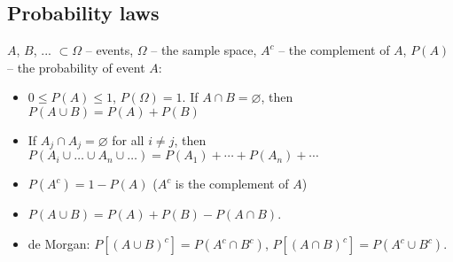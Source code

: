 \documentclass{article}
\newcommand{\Tr}[2]{#1}
\renewcommand{\vec}[1]{\mathbf{#1}}
\begin{document}
\begin{itemize}
  \end{itemize}%

\subsection*{\Tr{Probability laws}{Sannolikhetslära}}%

   $A$, $B$, ... $\subset\Omega$ -- \Tr{events}{händelser},
   $\Omega$ -- \Tr{the sample space}{utfallsrummet},
   $A^c$ -- \Tr{the complement of}{komplementet till} $A$,
   $P(A)$ -- \Tr{the probability of event}{sannolikheten för} $A$:

\begin{itemize}\advance\itemsep by -5pt
  \item $0\le P(A)\le 1$, \/ $P(\Omega)=1$. \/
  \Tr{If}{Om}
  $A\cap B=\varnothing$,
    \Tr{then}{då}
  $P(A\cup B)=P(A)+P(B)$
  \item \Tr{If}{Om}
    $A_j\cap A_j=\varnothing$
    \Tr{for all}{för alla} $i\neq j$,
    \Tr{then}{då}
    $P(A_i\cup \ldots \cup A_n\cup \ldots)=P(A_1)+\cdots + P(A_n)+\cdots$
   \item $P(A^c) = 1-P(A)$ ($A^c$ \Tr{is the complement of}{är komplementet till} $A$)
  \item $P(A\cup B) = P(A)+P(B)-P(A\cap B)$.
  \item de Morgan:
    $P[(A\cup B)^c]=P(A^c\cap B^c)$,
    $P[(A\cap B)^c]=P(A^c\cup B^c)$.
\end{itemize}
\end{document}
